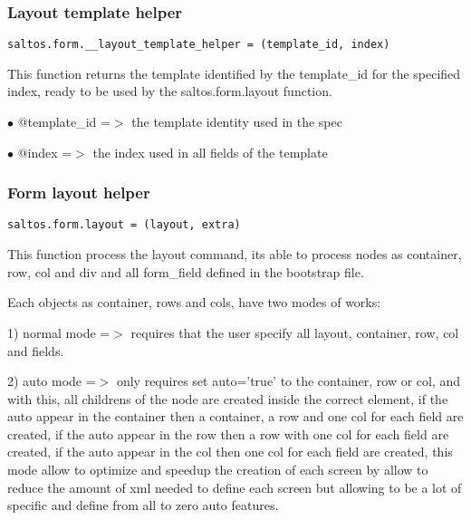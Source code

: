 \documentclass[a4paper]{article}
\begin{document}
\hypertarget{toc778}{}
\subsubsection{Layout template helper}

\begin{lstlisting}
saltos.form.__layout_template_helper = (template_id, index)
\end{lstlisting}

This function returns the template identified by the template\_id for the specified index, ready
to be used by the saltos.form.layout function.

\begin{compactitem}
\item[\color{myblue}$\bullet$] @template\_id =$>$ the template identity used in the spec
\item[\color{myblue}$\bullet$] @index       =$>$ the index used in all fields of the template
\end{compactitem}

\hypertarget{toc779}{}
\subsubsection{Form layout helper}

\begin{lstlisting}
saltos.form.layout = (layout, extra)
\end{lstlisting}

This function process the layout command, its able to process nodes as container, row, col and div
and all form\_field defined in the bootstrap file.

Each objects as container, rows and cols, have two modes of works:

1) normal mode =$>$ requires that the user specify all layout, container, row, col and fields.

2) auto mode =$>$ only requires set auto='true' to the container, row or col, and with this, all childrens
of the node are created inside the correct element, if the auto appear in the container then a container,
a row and one col for each field are created, if the auto appear in the row then a row with one col for
each field are created, if the auto appear in the col then one col for each field are created, this mode
allow to optimize and speedup the creation of each screen by allow to reduce the amount of xml needed
to define each screen but allowing to be a lot of specific and define from all to zero auto features.
\end{document}
